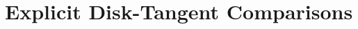\section{Explicit Disk-Tangent Comparisons}
\label{sec:strategy4-exact-certificate}
\let\Fcertificateheading\subsection


